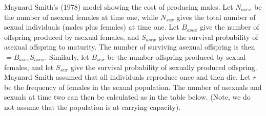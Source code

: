 \documentclass[
  letterpaper,
]{book}
\begin{document}
\begin{tcolorbox}[enhanced jigsaw, rightrule=.15mm, bottomtitle=1mm, opacitybacktitle=0.6, titlerule=0mm, opacityback=0, colbacktitle=quarto-callout-note-color!10!white, arc=.35mm, coltitle=black, title=\textcolor{quarto-callout-note-color}{\faInfo}\hspace{0.5em}{Box 1.2}, breakable, left=2mm, bottomrule=.15mm, leftrule=.75mm, toptitle=1mm, toprule=.15mm, colframe=quarto-callout-note-color-frame, colback=white]

Maynard Smith's (1978) model showing the cost of producing
males.\footnotemark{} Let \(N_{asex}\) be the number of asexual females
at time one, while \(N_{sex}\) gives the total number of sexual
individuals (males plus females) at time one. Let \(B_{asex}\) give the
number of offspring produced by asexual females, and \(S_{asex}\) gives
the survival probability of asexual offspring to maturity. The number of
surviving asexual offspring is then \(= B_{asex}S_{asex}\). Similarly,
let \(B_{sex}\) be the number offspring produced by sexual females, and
let \(S_{sex}\) give the survival probability of sexually produced
offspring. Maynard Smith assumed that all individuals reproduce once and
then die. Let \(r\) be the frequency of females in the sexual
population. The number of asexuals and sexuals at time two can then be
calculated as in the table below. (Note, we do not assume that the
population is at carrying capacity).


\end{tcolorbox}
\end{document}
